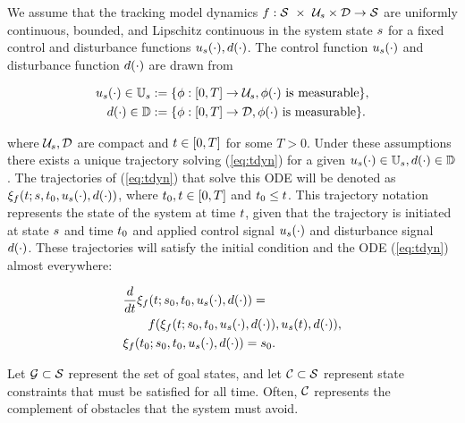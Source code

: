 We assume that the tracking model dynamics $f : \mathcal{S}\ \times\ \mathcal{U}_s \times \mathcal{D} \rightarrow \mathcal{S}$ are uniformly continuous, bounded, and Lipschitz continuous in the system state $s$ for a fixed control and disturbance functions $u_s(\cdot), d(\cdot)$. The control function $u_s(\cdot)$ and disturbance function $d(\cdot)$ are drawn from

\begin{align}
u_s(\cdot) \in \mathbb{U}_s &:= \{\phi: [0, T] \rightarrow \mathcal{U}_s, \phi(\cdot) \text{ is measurable}\},\\
d(\cdot) \in \mathbb{D} &:= \{\phi: [0, T] \rightarrow \mathcal{D}, \phi(\cdot) \text{ is measurable}\}.
\end{align}


\noindent where $\mathcal{U}_s, \mathcal{D}$ are compact and $t\in[0, T]$ for some $T>0$. Under these assumptions there exists a unique trajectory solving (\ref{eq:tdyn}) for a given $u_s(\cdot) \in \mathbb{U}_s, d(\cdot)\in\mathbb{D}$ \cite{Coddington84}. The trajectories of (\ref{eq:tdyn}) that solve this ODE will be denoted as $\xi_{f}(t; s, t_0, u_s(\cdot), d(\cdot))$, where $t_0,t \in [0, T]$ and $t_0 \leq t$. This trajectory notation represents the state of the system at time $t$, given that the trajectory is initiated at state $s$ and time $t_0$ and applied control signal $u_s(\cdot)$ and disturbance signal $d(\cdot)$.  These trajectories will satisfy the initial condition and the ODE (\ref{eq:tdyn}) almost everywhere:

\begin{align*}
&\frac{d}{dt}\xi_{f}(t; s_0, t_0, u_s(\cdot), d(\cdot)) = \\ &\qquad f(\xi_{f}(t; s_0, t_0, u_s(\cdot), d(\cdot)), u_s(t), d(\cdot)), \\
&\xi_{f}(t_0; s_0, t_0, u_s(\cdot), d(\cdot)) = s_0.
\end{align*}

Let $\mathcal G \subset \mathcal{S}$ represent the set of goal states, and let $\mathcal C \subset \mathcal{S}$ represent state constraints that must be satisfied for all time.
Often, $\mathcal C$ represents the complement of obstacles that the system must avoid.

